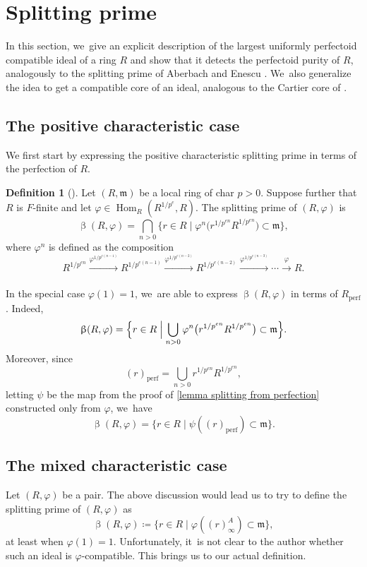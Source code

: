 \documentclass[11pt]{article}
\let\autoref\cref
\theoremstyle{plain}
\theoremstyle{definition}
\newtheorem{definition}[theorem]{Definition}
\numberwithin{equation}{theorem}
\newcommand{\fram}{\mathfrak{m}}
\DeclareMathOperator{\Hom}{Hom}
\newcommand{\perf}{_{\mathrm{perf}}}
\newcommand{\unpe}{{1/{p^e}}}
\renewcommand{\phi}{\varphi}
\newcommand{\rphi}{(R,\phi)}
\begin{document}
\section{Splitting prime}
In this section, we~give an explicit description of the largest uniformly perfectoid compatible ideal of a ring $R$ and show that it detects the perfectoid purity of $R$, analogously to the splitting prime of Aberbach and Enescu \cite{AberbachEnescuStructureOfFPure}. We~also generalize the idea to get a compatible core of an ideal, analogous to the Cartier core of \cite{BadillaCespedesFInvariantsSRRings,BrosowskyCartierCoreMap,CarvajalFayolleTameRamificationCFPS}.

\subsection{The positive characteristic case}
We first start by expressing the positive characteristic splitting prime in terms of the perfection of $R$.

\begin{definition}[{\cite{AberbachEnescuStructureOfFPure}}]
Let $(R,\fram)$ be a local ring of char $p>0$. Suppose further that $R$ is $F$-finite and let $\phi\in \Hom_R\left(R^\unpe,R\right)$. The splitting prime of $\rphi$ is
\[
\upbeta\rphi=\bigcap_{n>0} \bigl\{r\in R\mid \phi^n\bigl(r^{1/p^{en}}R^{1/p^{en}} \bigr)\subset \fram \bigr\},
\]
where $\phi^n$ is defined as the composition
\[
R^{1/p^{en}}\xrightarrow[]{\phi^{1/p^{e(n-1)}}}R^{1/p^{e(n-1)}}\xrightarrow[]{\phi^{1/p^{e(n-2)}}}R^{1/p^{e(n-2)}}\xrightarrow[]{\phi^{1/p^{e(n-3)}}}\cdots \xrightarrow[]{\phi} R.
\]
\end{definition}

In the special case $\phi(1)=1$, we~are able to express $\upbeta\rphi$ in terms of $R\perf$. Indeed,
\[
\upbeta\rphi = \Bigl\{r\in R \Bigm| \bigcup_{n>0}\phi^n\bigl(r^{1/p^{en}}R^{1/p^{en}}\bigr)\subset \fram \Bigr\}.
\]
Moreover, since
\[
(r)\perf=\bigcup_{n>0} r^{1/p^{en}}R^{1/p^{en}},
\]
letting $\psi$ be the map from the proof of \autoref{lemma splitting from perfection} constructed only from $\phi$, we~have
\[
\upbeta\rphi=\{r\in R\mid \psi((r)\perf)\subset \fram\}.
\]

\subsection{The mixed characteristic case}
Let $\rphi$ be a pair. The above discussion would lead us to try to define the splitting prime of $\rphi$ as
\[
\upbeta\rphi\coloneqq\{r\in R\mid \phi\left((r)_\infty^A\right)\subset \fram\},
\]
at least when $\phi(1)=1$.
Unfortunately, it~is not clear to the author whether such an ideal is $\phi$-compatible. This brings us to our actual definition.
\end{document}
